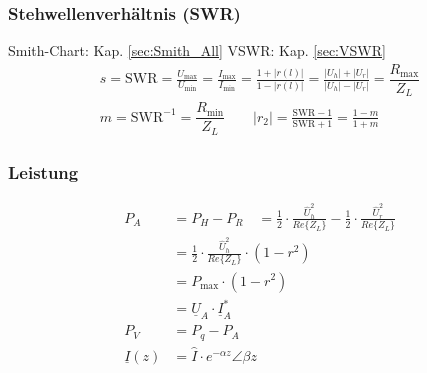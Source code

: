 
\subsubsection{Stehwellenverhältnis (SWR)}
Smith-Chart: Kap. \ref{sec:Smith_All} \qquad VSWR: Kap. \ref{sec:VSWR}
\begin{align*}
    &s = \mathrm{SWR}       = \frac{U_\text{max}}{U_\text{min}} = \frac{I_\text{max}}{I_\text{min}} = \frac{1+|r(l)|}{1-|r(l)|} = \frac{|U_h|+|U_r|}{|U_h|-|U_r|}= \dfrac{R_{\text{max}}}{Z_L}&                                                        \\
    &m = \mathrm{SWR}^{-1} = \dfrac{R_{\text{min}}}{Z_L} \qquad |r_2| = \frac{\text{SWR}-1}{\text{SWR}+1} = \frac{1-m}{1+m} &
\end{align*}

\subsubsection{Leistung}
\begin{align*}
    P_{A}            & = P_{H}-P_{R}                                                                                                
                     \quad = \frac{1}{2} \cdot \frac{\hat{U}_{h}^{2}}{Re\{Z_{L}\}}-\frac{1}{2} \cdot \frac{\hat{U}_{r}^{2}}{Re\{Z_{L}\}} \\
                     & =\frac{1}{2} \cdot \frac{\hat{U}_{h}^{2}}{Re\{Z_{L}\}} \cdot\left(1-r^{2}\right)                              \\
                     & = P_{\max} \cdot\left(1-r^{2}\right)                                                                          \\
                     & = \underline{U}_A\cdot\underline{I}_A^*                                                                       \\
    P_V              & = P_q -P_A                                                                                                    \\
    \underline{I}(z) & = \hat{I}\cdot e^{-\alpha z}\angle \beta z
	\end{align*}
